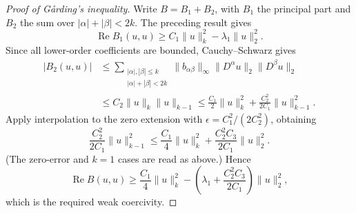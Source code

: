 \begin{proof}[Proof of G\aa rding's inequality]
Write $B=B_1+B_2$, with $B_1$ the principal part and $B_2$ the sum over
$|\alpha|+|\beta|<2k$. The preceding result gives
\[
\operatorname{Re}B_1(u,u)\geq C_1\|u\|_k^2-\lambda_1\|u\|_2^2.
\]
Since all lower-order coefficients are bounded, Cauchy--Schwarz gives
\begin{align*}
|B_2(u,u)|
&\leq\sum_{\substack{|\alpha|,|\beta|\leq k\\|\alpha|+|\beta|<2k}}
 \|b_{\alpha\beta}\|_\infty\|D^\alpha u\|_2\|D^\beta u\|_2\\
&\leq C_2\|u\|_k\|u\|_{k-1}
\leq\frac{C_1}{2}\|u\|_k^2+\frac{C_2^2}{2C_1}\|u\|_{k-1}^2.
\end{align*}
Apply interpolation to the zero extension with
$\epsilon=C_1^2/(2C_2^2)$, obtaining
\[
\frac{C_2^2}{2C_1}\|u\|_{k-1}^2
\leq\frac{C_1}{4}\|u\|_k^2+\frac{C_2^2C_3}{2C_1}\|u\|_2^2.
\]
(The zero-error and $k=1$ cases are read as above.) Hence
\[
\operatorname{Re}B(u,u)\geq\frac{C_1}{4}\|u\|_k^2-
\left(\lambda_1+\frac{C_2^2C_3}{2C_1}\right)\|u\|_2^2,
\]
which is the required weak coercivity.
\end{proof}
